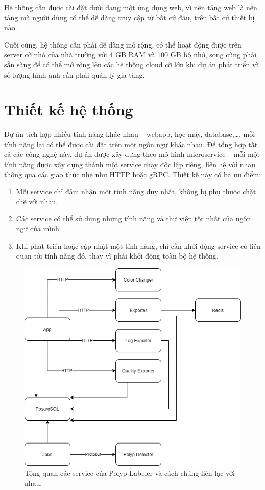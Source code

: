 \documentclass[12pt]{extreport}
\begin{document}
Hệ thống cần được cài đặt dưới dạng một ứng dụng web, vì nền tảng web là nền tảng mà người dùng có thể dễ dàng truy cập từ bất cứ đâu, trên bất cứ thiết bị nào.

Cuối cùng, hệ thống cần phải dễ dàng mở rộng, có thể hoạt động được trên server cỡ nhỏ của nhà trường với 4 GB RAM và 100 GB bộ nhớ, song cũng phải sẵn sàng để có thể mở rộng lên các hệ thống cloud cỡ lớn khi dự án phát triển và số lượng hình ảnh cần phải quản lý gia tăng.

\section{Thiết kế hệ thống}

Dự án tích hợp nhiều tính năng khác nhau – webapp, học máy, database,\dots , mỗi tính năng lại có thể được cài đặt trên một ngôn ngữ khác nhau. Để tổng hợp tất cả các công nghệ này, dự án được xây dựng theo mô hình microservice – mỗi một tính năng được xây dựng thành một service chạy độc lập riêng, liên hệ với nhau thông qua các giao thức nhẹ như HTTP hoặc gRPC. Thiết kế này có ba ưu điểm:
\begin{enumerate}
    \item Mỗi service chỉ đảm nhận một tính năng duy nhất, không bị phụ thuộc chặt chẽ với nhau.
    \item Các service có thể sử dụng những tính năng và thư viện tốt nhất của ngôn ngữ của mình.
    \item Khi phát triển hoặc cập nhật một tính năng, chỉ cần khởi động service có liên quan tới tính năng đó, thay vì phải khởi động toàn bộ hệ thống.
\end{enumerate}

\begin{figure}[h]
    \centering
    \includegraphics[width=0.85\linewidth]{figure41.png}
    \caption{Tổng quan các service của Polyp-Labeler và cách chúng liên lạc với nhau.}
\end{figure}
\end{document}
